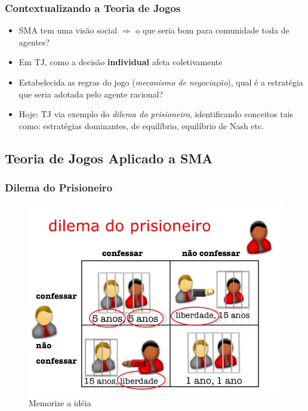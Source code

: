 \begin{frame}

    \frametitle{Contextualizando a Teoria de Jogos}
    \begin{itemize}
    \item SMA tem uma visão social $\Rightarrow $ o que seria bom para comunidade toda de agentes?
    
    \item Em TJ, como a decisão \textbf{individual} afeta coletivamente
    \item Estabelecida as regras do jogo (\textit{mecanismo de negociação}),
    qual é a estratégia que seria adotada pelo agente racional?
    
    \item Hoje: TJ via exemplo do \textit{dilema do prisioneiro},
    identificando conceitos tais como: estratégias dominantes, de equilíbrio, equilíbrio de Nash etc.
    
    \end{itemize}
\end{frame}



\subsection{Teoria de Jogos Aplicado a SMA}

\begin{frame}

\frametitle{Dilema do Prisioneiro}

    
\begin{figure}[!ht]
\centering
\includegraphics[height =.6\textheight, width=.7\textwidth]{figuras/dilema_prisioneiros01.jpg}
\caption{Memorize a idéia}
\end{figure}


\end{frame}





